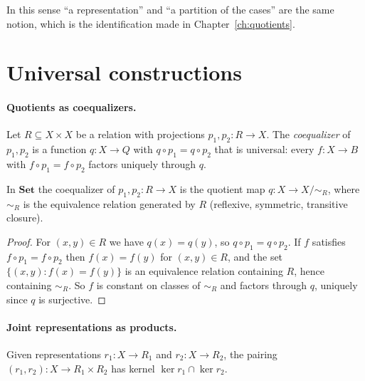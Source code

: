 In this sense ``a representation'' and ``a partition of the cases'' are the same notion, which is the identification made in Chapter~\ref{ch:quotients}.

\section{Universal constructions}

\paragraph{Quotients as coequalizers.} Let $R\subseteq X\times X$ be a relation with projections $p_1,p_2:R\to X$. The \emph{coequalizer} of $p_1,p_2$ is a function $q:X\to Q$ with $q\circ p_1=q\circ p_2$ that is universal: every $f:X\to B$ with $f\circ p_1=f\circ p_2$ factors uniquely through $q$.

\begin{newresult}\label{pb:coeq}
In $\mathbf{Set}$ the coequalizer of $p_1,p_2:R\to X$ is the quotient map $q:X\to X/{\sim_R}$, where $\sim_R$ is the equivalence relation generated by $R$ (reflexive, symmetric, transitive closure).
\end{newresult}
\begin{proof}
For $(x,y)\in R$ we have $q(x)=q(y)$, so $q\circ p_1=q\circ p_2$. If $f$ satisfies $f\circ p_1=f\circ p_2$ then $f(x)=f(y)$ for $(x,y)\in R$, and the set $\{(x,y):f(x)=f(y)\}$ is an equivalence relation containing $R$, hence containing $\sim_R$. So $f$ is constant on classes of $\sim_R$ and factors through $q$, uniquely since $q$ is surjective.
\end{proof}

\paragraph{Joint representations as products.} Given representations $r_1:X\to R_1$ and $r_2:X\to R_2$, the pairing $(r_1,r_2):X\to R_1\times R_2$ has kernel $\ker r_1\cap\ker r_2$.

